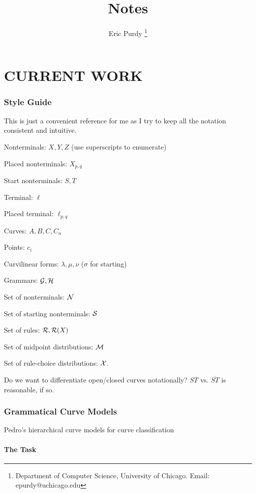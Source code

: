 \documentclass{article}
\title{Notes}
\author{Eric Purdy \footnote{Department of Computer Science,
    University of Chicago. Email: epurdy@uchicago.edu}}
\begin{document}
\maketitle

\tableofcontents

\part{CURRENT WORK}

\section{Style Guide}

This is just a convenient reference for me as I try to keep all the
notation consistent and intuitive.

\bitem
\item Nonterminals: $X,Y,Z$ (use superscripts to enumerate)
\item Placed nonterminals: $X_{p,q}$
\item Start nonterminals: $S,T$
\item Terminal: $\ell$
\item Placed terminal: $\ell_{p,q}$
\item Curves: $A,B,C, C_n$
\item Points: $c_i$
\item Curvilinear forms: $\lambda, \mu, \nu$ ($\sigma$ for starting)
\item Grammars: ${\mathcal G}, {\mathcal H}$
\item Set of nonterminals: ${\mathcal N}$
\item Set of starting nonterminals: ${\mathcal S}$
\item Set of rules: ${\mathcal R}, {\mathcal R}(X)$
\item Set of midpoint distributions: ${\mathcal M}$
\item Set of rule-choice distributions: ${\mathcal X}$.
\item Do we want to differentiate open/closed curves notationally?
$ST$ vs. $\overline{ST}$ is reasonable, if so.
\eitem

\section{Grammatical Curve Models }

Pedro's hierarchical curve models for curve classification

\subsection{The Task}
\end{document}
